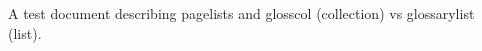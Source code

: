 \documentclass{article}
\begin{document}
A test document describing \glspl{pagelist} and
\gls{glosscol} (collection) vs \gls{glossarylist} (list).

\printunsrtglossary
\end{document}
